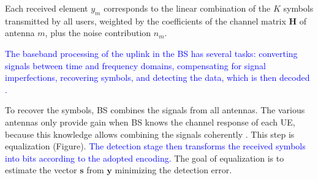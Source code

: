 Each received element $y_m$ corresponds to the linear combination of the $K$ symbols
transmitted by all users, weighted by the coefficients of the channel matrix $\mathbf{H}$ of antenna $m$, plus the noise contribution $n_m$.

\textcolor{blue}{The baseband processing of the uplink in the BS has several tasks: converting signals between time and frequency domains, compensating for signal imperfections, recovering symbols, and detecting the data, which is then decoded \cite{decentralized2017}.}

To recover the symbols, BS combines the signals from all antennas. The various antennas only provide gain when BS knows the channel response of each UE, because this knowledge allows combining the signals coherently \textcolor{red}{\cite{bjornson-mimo}}. This step is equalization (Figure). \textcolor{blue}{The detection stage then transforms the received symbols into bits according to the adopted encoding.} The goal of equalization is to estimate the vector $\mathbf{s}$ from $\mathbf{y}$ minimizing the detection error.
